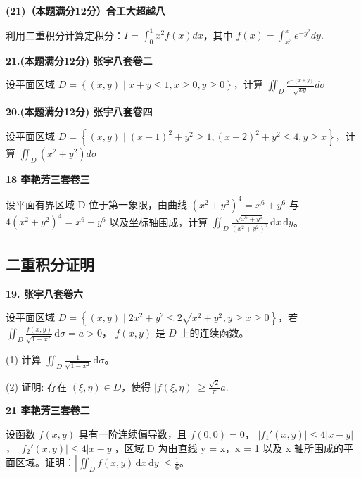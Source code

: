 \documentclass[a4paper,12pt]{article}
\begin{document}
\vspace{0.5cm}

\textbf{(21)（本题满分12分）合工大超越八}

利用二重积分计算定积分：$I=\int_{0}^{1}x^{2}f(x)dx$，其中 $f(x)=\int_{x^{3}}^{x}e^{-y^{2}}dy.$

\vspace{0.5cm}

\textbf{21.(本题满分12分) 张宇八套卷二}

设平面区域 $D=\left\{(x,y)\mid x+y\leqslant1,x\geqslant0,y\geqslant0\right\}$，计算 $\iint_{D}\frac{e^{-(x+y)}}{\sqrt{xy}}d\sigma$

\vspace{0.5cm}

\textbf{20.(本题满分12分) 张宇八套卷四}

设平面区域 $D=\left\{(x,y)\mid(x-1)^{2}+y^{2}\geqslant1,(x-2)^{2}+y^{2}\leqslant4,y\geqslant x\right\}$，计算 $\iint_{D}(x^{2}+y^{2})d\sigma$

\vspace{0.5cm}

\textbf{18 李艳芳三套卷三}

设平面有界区域 D 位于第一象限，由曲线 $(x^{2} + y^{2})^{4} = x^{6} + y^{6}$ 与 $4(x^{2} + y^{2})^{4} = x^{6} + y^{6}$ 以及坐标轴围成，计算 $\iint_{D} \frac{\sqrt{x^{6} + y^{6}}}{(x^{2} + y^{2})^{2}} \, \mathrm{d}x \, \mathrm{d}y$。

\subsection{二重积分证明}

\textbf{19. 张宇八套卷六}

设平面区域 $D = \left\{(x, y) \mid 2x^2 + y^2 \leqslant 2\sqrt{x^2 + y^2}, y \geqslant x \geqslant 0\right\}$，若 $\iint_D \frac{f(x, y)}{\sqrt{1 - x^2}} \, \mathrm{d}\sigma = a > 0$， $f(x, y)$ 是 $D$ 上的连续函数。

(1) 计算 $\iint_D \frac{1}{\sqrt{1 - x^2}} \, \mathrm{d}\sigma$。

(2) 证明: 存在 $(\xi, \eta) \in D$，使得 $|f(\xi, \eta)| \geq \frac{\sqrt{2}}{\pi} a$.

\vspace{0.5cm}

\textbf{21 李艳芳三套卷二}

设函数 $ f(x, y) $ 具有一阶连续偏导数，且 $ f(0, 0) = 0 $， $ |f_1'(x, y)| \leqslant 4 |x - y| $， $ |f_2'(x, y)| \leqslant 4 |x - y| $，区域 D 为由直线 y = x，x = 1 以及 x 轴所围成的平面区域。证明：$ \left| \iint_{D} f(x, y) \, \mathrm{d}x \, \mathrm{d}y \right| \leqslant \frac{1}{6} $。
\end{document}
